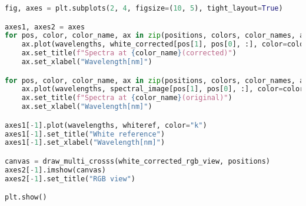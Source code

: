 \begin{lstlisting}[language=python, caption=White correction for SpecimIQ with large reference, label={code:wc-specimiq-large}]
fig, axes = plt.subplots(2, 4, figsize=(10, 5), tight_layout=True)

axes1, axes2 = axes
for pos, color, color_name, ax in zip(positions, colors, color_names, axes2):
    ax.plot(wavelengths, white_corrected[pos[1], pos[0], :], color=color)
    ax.set_title(f"Spectra at {color_name}(corrected)")
    ax.set_xlabel("Wavelength[nm]")

for pos, color, color_name, ax in zip(positions, colors, color_names, axes1):
    ax.plot(wavelengths, spectral_image[pos[1], pos[0], :], color=color)
    ax.set_title(f"Spectra at {color_name}(original)")
    ax.set_xlabel("Wavelength[nm]")

axes1[-1].plot(wavelengths, whiteref, color="k")
axes1[-1].set_title("White reference")
axes1[-1].set_xlabel("Wavelength[nm]")

canvas = draw_multi_crosss(white_corrected_rgb_view, positions)
axes2[-1].imshow(canvas)
axes2[-1].set_title("RGB view")

plt.show()

\end{lstlisting}